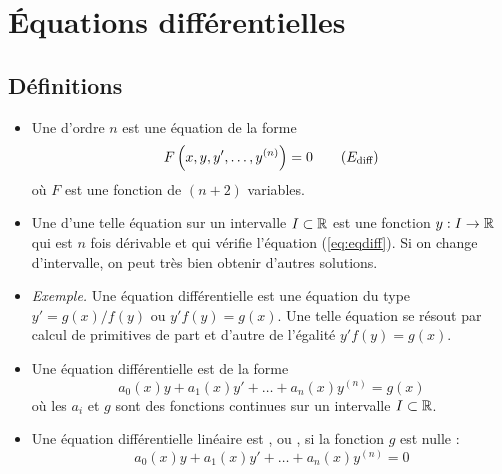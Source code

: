 \documentclass[10pt,class=article,crop=false]{standalone}
\begin{document}
\section{Équations différentielles}

\begin{multicols}{2}

\subsection{Définitions}

\begin{itemize}
	\item Une  d'ordre $n$ est une équation de la forme
	\begin{equation}
		F\left(x,y,y',\dots ,y^{(n)}\right)=0
		\label{eq:eqdiff}
		\tag{$E_{\text{diff}}$}
	\end{equation}
	où $F$ est une fonction de $(n+2)$ variables.
	
	\item Une  d'une telle équation sur un intervalle $I\subset \mathbb{R}$
	est une fonction $y :I \to \mathbb{R}$ qui est $n$ fois dérivable
	et qui vérifie l'équation (\ref{eq:eqdiff}). Si on change d'intervalle, on peut très bien obtenir d'autres solutions.


	\item  \emph{Exemple.} Une équation différentielle 
est une équation du type $y'=g(x)/f(y)$ ou $y'f(y)=g(x)$.
Une telle équation se résout par calcul de primitives de part et d'autre de l'égalité $y'f(y)=g(x)$.


	\item Une équation différentielle  est de la forme
	\begin{equation}
	a_0(x)y+a_1(x)y'+\dots +a_n(x)y^{(n)} = g(x)
	\label{eq:eqdifflinscnd}
	\tag{$E$}
	\end{equation}	
	où les $a_i$ et $g$ sont des fonctions continues sur un intervalle $I\subset \mathbb{R}$.
	
	\item Une équation différentielle linéaire est 
	, ou 
	,
	si la fonction $g$ est nulle :
	\begin{equation}
	a_0(x)y+a_1(x)y'+\dots +a_n(x)y^{(n)} = 0
	\label{eq:eqdiffhomog}
	\tag{$E_h$}
    \end{equation}	


\end{itemize}
\end{multicols}
\end{document}
